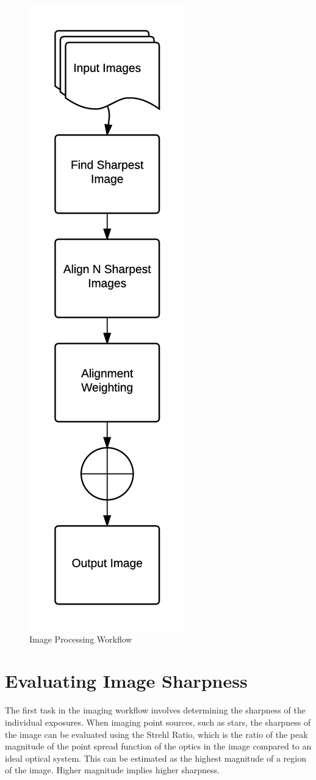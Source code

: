 \documentclass[conference]{IEEEtran}
\newcommand{\centerimage}[3]{
\begin{figure}[!h]  
\centering
#1
\caption{#2}
\label{#3}
\end{figure}}
\begin{document}
\centerimage{\includegraphics{img/algorithm.png}}{Image Processing Workflow}{fig:workflow}

\section{Evaluating Image Sharpness}
The first task in the imaging workflow involves determining the
sharpness of the individual exposures. When imaging point sources,
such as stars, the sharpness of the image can be evaluated using the
Strehl Ratio\cite{strehl}, which is the ratio of the peak magnitude of
the point spread function of the optics in the image compared to an
ideal optical system. This can be estimated as the highest magnitude
of a region of the image. Higher magnitude implies higher sharpness.
\end{document}
